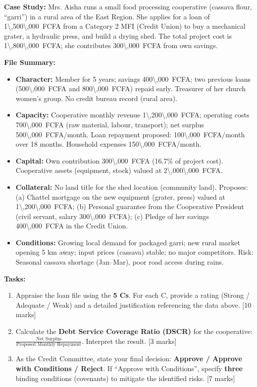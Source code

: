 \documentclass[11pt]{article}
\begin{document}
\begin{exercice}
\textbf{Case Study:} Mrs. Aisha runs a small food processing cooperative (cassava flour, ``garri'') in a rural area of the East Region. She applies for a loan of \SI{1\,500\,000}{FCFA} from a Category 2 MFI (Credit Union) to buy a mechanical grater, a hydraulic press, and build a drying shed. The total project cost is \SI{1\,800\,000}{FCFA}; she contributes \SI{300\,000}{FCFA} from own savings.

\textbf{File Summary:}
\begin{itemize}
\item \textbf{Character:} Member for 5 years; savings \SI{400\,000}{FCFA}; two previous loans (\SI{500\,000}{FCFA} and \SI{800\,000}{FCFA}) repaid early. Treasurer of her church women's group. No credit bureau record (rural area).
\item \textbf{Capacity:} Cooperative monthly revenue \SI{1\,200\,000}{FCFA}; operating costs \SI{700\,000}{FCFA} (raw material, labour, transport); net surplus \SI{500\,000}{FCFA}/month. Loan repayment proposed: \SI{100\,000}{FCFA}/month over 18 months. Household expenses \SI{150\,000}{FCFA}/month.
\item \textbf{Capital:} Own contribution \SI{300\,000}{FCFA} (16.7\% of project cost). Cooperative assets (equipment, stock) valued at \SI{2\,000\,000}{FCFA}.
\item \textbf{Collateral:} No land title for the shed location (community land). Proposes: (a) Chattel mortgage on the new equipment (grater, press) valued at \SI{1\,200\,000}{FCFA}; (b) Personal guarantee from the Cooperative President (civil servant, salary \SI{300\,000}{FCFA}); (c) Pledge of her savings \SI{400\,000}{FCFA} in the Credit Union.
\item \textbf{Conditions:} Growing local demand for packaged garri; new rural market opening 5 km away; input prices (cassava) stable; no major competitors. Risk: Seasonal cassava shortage (Jan--Mar), poor road access during rains.
\end{itemize}

\textbf{Tasks:}
\begin{enumerate}
\item Appraise the loan file using the \textbf{5 Cs}. For each C, provide a rating (Strong / Adequate / Weak) and a detailed justification referencing the data above. [10 marks]
\item Calculate the \textbf{Debt Service Coverage Ratio (DSCR)} for the cooperative: $\frac{\text{Net Surplus}}{\text{Proposed Monthly Repayment}}$. Interpret the result. [3 marks]
\item As the Credit Committee, state your final decision: \textbf{Approve / Approve with Conditions / Reject}. If ``Approve with Conditions'', specify \textbf{three} binding conditions (covenants) to mitigate the identified risks. [7 marks]
\end{enumerate}
\end{exercice}
\end{document}
